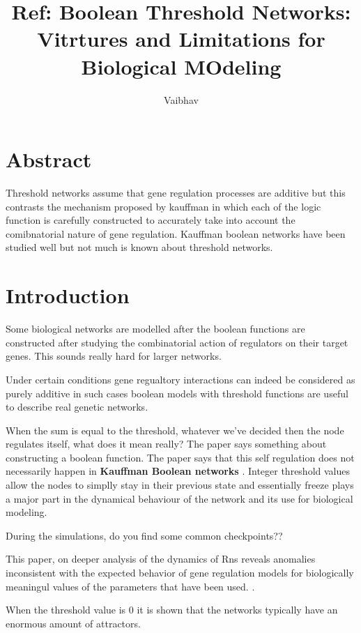 \documentclass{article}
\title{Ref: Boolean Threshold Networks: Vitrtures and Limitations for Biological MOdeling}
\author{Vaibhav}
\begin{document}
\maketitle

\section{Abstract}
Threshold networks assume that gene regulation processes are additive but this contrasts the mechanism proposed by kauffman in which each of the logic function is carefully constructed to accurately take into account the comibnatorial nature of gene regulation. Kauffman boolean networks have been studied well but not much is known about threshold networks. 

\section{Introduction}
Some biological networks are modelled after the boolean functions are constructed after studying the combinatorial action of regulators on their target genes. This sounds really hard for larger networks.


Under certain conditions gene regualtory interactions can indeed be considered as purely additive in such cases boolean models with threshold functions are useful to describe real genetic networks. 


When the sum is equal to the threshold, whatever we've decided then the node regulates itself, what does it mean really? The paper says something about constructing a boolean function.  The paper says that this self regulation does not necessarily happen in \textbf{ Kauffman Boolean networks }. Integer threshold values allow the nodes to simplly stay in their previous state and essentially freeze plays a major part in the dynamical behaviour of the network and its use for biological modeling. 




During the simulations, do you find some common checkpoints?? 


This paper, on deeper analysis of the dynamics of Rns reveals anomalies inconsistent with the expected behavior of gene regulation models for biologically meaningul values of the parameters that have been used. .

When the threshold value is 0 it is shown that the networks typically have an enormous amount of attractors. 
\end{document}

